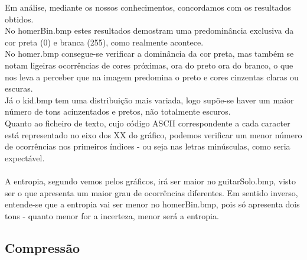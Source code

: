 \documentclass{article}
\begin{document}
Em análise, mediante os nossos conhecimentos, concordamos com os resultados obtidos.\\No homerBin.bmp estes resultados demostram uma predominância exclusiva da cor preta (0) e branca (255), como realmente acontece.\\No homer.bmp consegue-se verificar a dominância da cor preta, mas também se notam ligeiras ocorrências de cores próximas, ora do preto ora do branco, o que nos leva a perceber que na imagem predomina o preto e cores cinzentas claras ou escuras.\\Já o kid.bmp tem uma distribuição mais variada, logo supõe-se haver um maior número de tons acinzentados e pretos, não totalmente escuros.\\Quanto ao ficheiro de texto, cujo código ASCII correspondente a cada caracter está representado no eixo dos XX do gráfico, podemos verificar um menor número de ocorrências nos primeiros índices - ou seja nas letras minúsculas, como seria expectável.\\\\A entropia, segundo vemos pelos gráficos, irá ser maior no guitarSolo.bmp, visto ser o que apresenta um maior grau de ocorrências diferentes. Em sentido inverso, entende-se que a entropia vai ser menor no homerBin.bmp, pois só  apresenta dois tons - quanto menor for a incerteza, menor será a entropia.\\


\subsection{Compressão}
\end{document}

